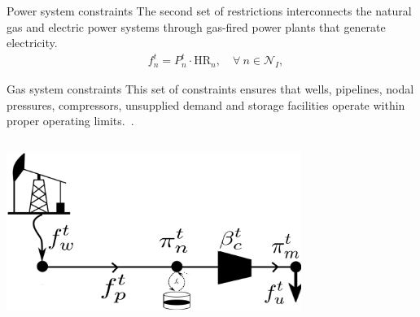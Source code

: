 \documentclass[hyperref={colorlinks,citecolor=blue,linkcolor=blue,urlcolor=blue}]{beamer}
\begin{document}
\begin{frame}{Power system constraints}
\vspace{1em}
The second set of restrictions interconnects the natural gas and electric power systems through gas-fired power plants that generate electricity.
\begin{align}
    &f_{n}^t = P_{n}^t \cdot \text{HR}_n, \quad \forall \ n \in \mathcal{N}_I, \label{eq:gas_power_relation} 
\end{align}
\end{frame}


\begin{frame}{Gas system constraints}
\justifying
\footnotesize
This set of constraints ensures that wells, pipelines, nodal pressures, compressors, unsupplied demand and storage facilities operate within proper operating limits.~\cite{MPNG}.

\begin{columns}
\begin{column}{0.5\textwidth}
    \includegraphics[width=0.75\textwidth]{figures/gas_dummy.png}
\end{column}

\begin{column}{0.5\textwidth}
\scriptsize %


\end{column}
\end{columns}
\end{frame}
\end{document}
